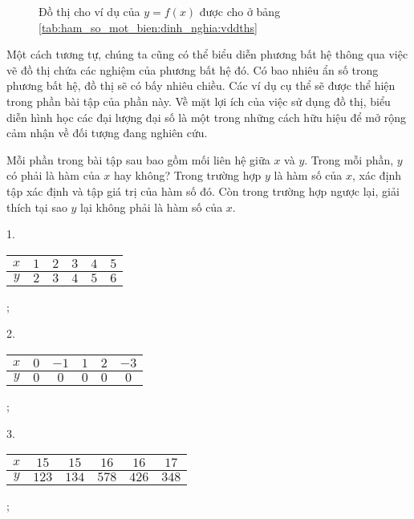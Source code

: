 \begin{figure}[h]
   \centering
   \caption{Đồ thị cho ví dụ của $y = f(x)$ được cho ở bảng \ref{tab:ham_so_mot_bien:dinh_nghia:vddths}}
   \label{fig:ham_so_mot_bien:dinh_nghia:vddths}
\end{figure}

Một cách tương tự, chúng ta cũng có thể biểu diễn phương bất hệ thông qua việc vẽ đồ thị chứa các nghiệm của phương bất hệ đó. Có bao nhiêu ẩn số trong phương bất hệ, đồ thị sẽ có bấy nhiêu chiều. Các ví dụ cụ thể sẽ được thể hiện trong phần bài tập của phần này. Về mặt lợi ích của việc sử dụng đồ thị, biểu diễn hình học các đại lượng đại số là một trong những cách hữu hiệu để mở rộng cảm nhận về đối tượng đang nghiên cứu.
      
\exercise Mỗi phần trong bài tập sau bao gồm mối liên hệ giữa $x$ và $y$. Trong mỗi phần, $y$ có phải là hàm của $x$ hay không? Trong trường hợp $y$ là hàm số của $x$, xác định tập xác định và tập giá trị của hàm số đó. Còn trong trường hợp ngược lại, giải thích tại sao $y$ lại không phải là hàm số của $x$.

1.
\begin{tabular}{|c|c|c|c|c|c|}
   \hline
   $x$ & $1$ & $2$ & $3$ & $4$ & $5$ \\
   \hline
   $y$ & $2$ & $3$ & $4$ & $5$ & $6$ \\
   \hline
\end{tabular};

2.
\begin{tabular}{|c|c|c|c|c|c|}
   \hline
   $x$ & $0$ & $-1$ & $1$ & $2$ & $-3$ \\
   \hline
   $y$ & $0$ & $0$ & $0$ & $0$ & $0$ \\
   \hline
\end{tabular};

3.
\begin{tabular}{|c|c|c|c|c|c|}
   \hline
   $x$ & $15$ & $15$ & $16$ & $16$ & $17$ \\
   \hline
   $y$ & $123$ & $134$ & $578$ & $426$ & $348$ \\
   \hline
\end{tabular};


